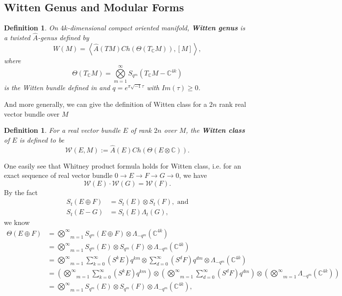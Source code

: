 \documentclass[11pt]{article}
\newtheorem{dfn}[thm]{Definition}
\newcommand{\cplx}{\mathbb C}
\begin{document}
\subsection{Witten Genus and Modular Forms}
\begin{dfn}
On $4k$-dimensional compact oriented manifold,
\textbf{Witten genus} is a twisted $\hat{A}$-genus defined by
\begin{equation*}
	W(M)=\left\langle\hat{A}(TM) Ch(\Theta(T_\mathbb{C}M)),[M] \right\rangle,
\end{equation*}
where 
\begin{equation*}
	\Theta(T_{\mathbb{C}}M)=\underset{m=1}{\overset{\infty}{\bigotimes}} S_{q^{m}}(T_{\mathbb{C}}M-\mathbb{C}^{4k})
\end{equation*}
is the Witten bundle defined in \cite{witten1988index} and $q=e^{\pi\sqrt{-1} \tau}$ with $Im(\tau)\geq 0$.
\end{dfn}
And more generally, we can give the definition of Witten class for a $2n$ rank real vector bundle over $M$ 
\begin{dfn}
For a real vector bundle $E$  of rank $2n$ over $M$, the \textbf{Witten class} of $E$ is defined to be 
$$
\mathcal{W}(E,M):=\hat{A}(E)Ch(\Theta(E\otimes \cplx)).
$$ 
\end{dfn}
One easily see that Whitney product formula holds for Witten class, i.e. for an exact sequence of real vector bundle $0\rightarrow E\rightarrow F\rightarrow G\rightarrow 0$, we have
$$
\mathcal{W}(E)\cdot\mathcal{W}(G)=\mathcal{W}(F).
$$
By the fact 
\begin{equation*}
\begin{aligned}
S_{t}(E \oplus F) & =S_{t}(E)\otimes S_{t}(F), \text{ and}\\
S_t(E-G)&=S_t(E)\Lambda_{t}(G),
\end{aligned}
\end{equation*}
we know
\begin{equation*}
\begin{aligned}
	\Theta(E\oplus F) & = \underset{m=1}{\overset{\infty}{\bigotimes}} S_{q^{m}}(E\oplus F)\otimes \Lambda_{-q^m}(\mathbb{C}^{4k})\\
	& =\underset{m=1}{\overset{\infty}{\bigotimes}} S_{q^m}(E)\otimes S_{q^m}(F)\otimes\Lambda_{-q^m}(\mathbb{C}^{4k})\\
	& = \underset{m=1}{\overset{\infty}{\bigotimes}}\sum^\infty_{k=0}(S^k E)q^{km}\otimes \sum^\infty_{d=0}(S^d F)q^{dm}\otimes\Lambda_{-q^m}(\mathbb{C}^{4k})\\
	& = \left(\underset{m=1}{\overset{\infty}{\bigotimes}}\sum^\infty_{k=0}(S^k E)q^{km}\right)\otimes \left(\underset{m=1}{\overset{\infty}{\bigotimes}}\sum^\infty_{d=0}(S^d F)q^{d m}\right)\otimes \left(\underset{m=1}{\overset{\infty}{\bigotimes}}\Lambda_{-q^m}(\mathbb{C}^{4k})\right)\\
	& = \underset{m=1}{\overset{\infty}{\bigotimes}} S_{q^m}(E)\otimes S_{q^m}(F)\otimes \Lambda_{-q^m}(\mathbb{C}^{4k}),
\end{aligned}
\end{equation*}
\end{document}
